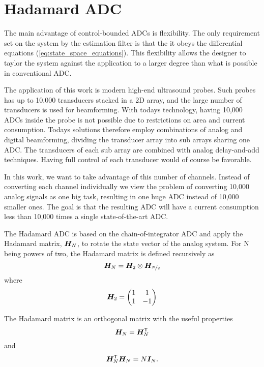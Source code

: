 
\chapter{Hadamard ADC}
The main advantage of control-bounded ADCs is flexibility. The only requirement set on the system by the estimation filter is that the it obeys the differential equations (\ref{eq:state_space_equations}). This flexibility allows the designer to taylor the system against the application to a larger degree than what is possible in conventional ADC.

The application of this work is modern high-end ultrasound probes. Such probes has up to 10,000 transducers stacked in a 2D array, and the large number of transducers is used for beamforming. With todays technology, having 10,000 ADCs inside the probe is not possible due to restrictions on area and current consumption. Todays solutions therefore employ combinations of analog and digital beamforming, dividing the transducer array into sub arrays sharing one ADC. The transducers of each sub array are combined with analog delay-and-add techniques. Having full control of each transducer would of course be favorable.

In this work, we want to take advantage of this number of channels. Instead of converting each channel individually we view the problem of converting 10,000 analog signals as one big task, resulting in one huge ADC instead of 10,000 smaller ones. The goal is that the resulting ADC will have a current consumption less than 10,000 times a single state-of-the-art ADC.

The Hadamard ADC is based on the chain-of-integrator ADC and apply the Hadamard matrix, $\bm{H_}{N}$, to rotate the state vector of the analog system. For N being powers of two, the Hadamard matrix is defined recursively as
\begin{equation}
    \label{eq:defn}
    \bm{H_}{N} = \bm{H_}{2} \otimes \bm{H_}{\nicefrac{N}{2}}
\end{equation}
where
\begin{equation}
    \label{eq:def2}
    \bm{H_}{2} =
    \begin{pmatrix}
    1 & 1 \\
    1 & -1
    \end{pmatrix}
\end{equation}

The Hadamard matrix is an orthogonal matrix with the useful properties
\begin{equation}
    \label{eq:Hmat_symmetry}
    \bm{H_}{N} = \bm{H_}{N}^\mathsf{T}
\end{equation}
and
\begin{equation}
    \label{eq:Hmat_inverse}
    \bm{H_}{N}^\mathsf{T}\bm{H_}{N} = N\bm{I}_{N}.
\end{equation}


